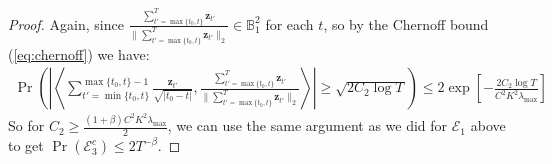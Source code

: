 \begin{proof}
Again, since $\frac{\sum_{t'=\max\{t_0,t\}}^{T}\mathbf{z}_{t'}}{\lVert\sum_{t'=\max\{t_0,t\}}^{T}\mathbf{z}_{t'}\rVert_2} \in \mathbb{B}^2_1$ for each $t$, so by the Chernoff bound (\ref{eq:chernoff}) we have:
\begin{align*}
    \Pr\left(\left|\left\langle \sum_{t'=\min\{t_0,t\}}^{\max\{t_0,t\}-1}\frac{\mathbf{z}_{t'}}{\sqrt{|t_0-t|}}, \frac{\sum_{t'=\max\{t_0,t\}}^{T}\mathbf{z}_{t'}}{\lVert\sum_{t'=\max\{t_0,t\}}^{T}\mathbf{z}_{t'}\rVert_2}\right\rangle\right| \geq \sqrt{2C_2\log T}\right) \leq 2\exp\left[-\frac{2C_2\log T}{C^2K^2\lambda_{\max}}\right] 
\end{align*}
So for $C_2 \geq \frac{(1+\beta)C^2K^2\lambda_{\max}}{2}$, we can use the same argument as we did for $\mathcal{E}_1$ above to get $\Pr(\mathcal{E}_3^c) \leq 2T^{-\beta}$.


\end{proof}
